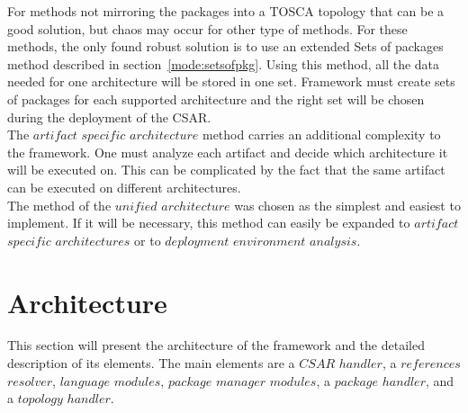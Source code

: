 For methods not mirroring the packages into a TOSCA topology that can be a good solution, but chaos may occur for other type of methods.
For these methods, the only found robust solution is to use an extended Sets of packages method described in section~\ref{mode:setsofpkg}. 
Using this method, all the data needed for one architecture will be stored in one set.
Framework must create sets of packages for each supported architecture and the right set will be chosen during the deployment of the CSAR.
\\
The $artifact$ $specific$ $architecture$ method carries an additional complexity to the framework.
One must analyze each artifact and decide which architecture it will be executed on. 
This can be complicated by the fact that the same artifact can be executed on different architectures.\\
The method of the $unified$ $architecture$ was chosen as the simplest and easiest to implement.
If it will be necessary, this method can easily be expanded to $artifact$ $specific$ $architectures$ or to $deployment$ $environment$ $analysis$.

%



\section{Architecture}\label{sec:arch}
This section will present the architecture of the framework and the detailed description of its elements.
The main elements are a \boldmath $CSAR$ $handler$, a $references$ $resolver$, $language$ $modules$, $package$ $manager$ $modules$, a $package$ $handler$, and a $topology$ $handler$. \unboldmath

